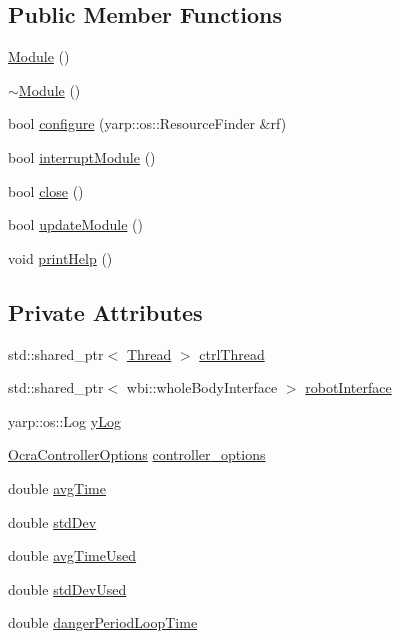 \subsection*{Public Member Functions}
\begin{DoxyCompactItemize}
\item 
\hyperlink{classModule_a5a240a8a9ab1813b17bcb810b24ceaea}{Module} ()
\item 
\hyperlink{classModule_a7c9d9c096786d127590fdd8aa2b7d681}{$\sim$\+Module} ()
\item 
bool \hyperlink{classModule_a1f18c762538086e1304ea18e00e51abb}{configure} (yarp\+::os\+::\+Resource\+Finder \&rf)
\item 
bool \hyperlink{classModule_ad53295be6c51e834eec92009c2d7bbf3}{interrupt\+Module} ()
\item 
bool \hyperlink{classModule_ab07583e4393148dfe0fd2ae6e7998a4b}{close} ()
\item 
bool \hyperlink{classModule_a1b1c4963512941537cef766217329a8a}{update\+Module} ()
\item 
void \hyperlink{classModule_a861f70d79b8f36dccf5daae182763bd8}{print\+Help} ()
\end{DoxyCompactItemize}
\subsection*{Private Attributes}
\begin{DoxyCompactItemize}
\item 
std\+::shared\+\_\+ptr$<$ \hyperlink{classThread}{Thread} $>$ \hyperlink{classModule_a39346aa2e2a00801e07f4c127ff004ba}{ctrl\+Thread}
\item 
std\+::shared\+\_\+ptr$<$ wbi\+::whole\+Body\+Interface $>$ \hyperlink{classModule_a0d3efedabcef6ec0db88011ccc2e7205}{robot\+Interface}
\item 
yarp\+::os\+::\+Log \hyperlink{classModule_ae029b50069bf4ff53a6f69a5bae824f6}{y\+Log}
\item 
\hyperlink{classOcraControllerOptions}{Ocra\+Controller\+Options} \hyperlink{classModule_a04156183c6e15f118595e3637ab5372f}{controller\+\_\+options}
\item 
double \hyperlink{classModule_a1a20dbf0d18e5020ad85d38a0ba22b88}{avg\+Time}
\item 
double \hyperlink{classModule_af66a2dab82208cb2ea25da22fcaaa4a3}{std\+Dev}
\item 
double \hyperlink{classModule_a5baf8260eb8a45ebbb75474f2b277edc}{avg\+Time\+Used}
\item 
double \hyperlink{classModule_a57060f2788b6dc9906e66432e775e5ac}{std\+Dev\+Used}
\item 
double \hyperlink{classModule_a33fee1e7f977b4f27a2e1488480996fb}{danger\+Period\+Loop\+Time}
\end{DoxyCompactItemize}
